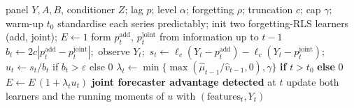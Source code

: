 \documentclass[pdflatex,sn-mathphys-ay]{sn-jnl}%
\theoremstyle{thmstyleone}%
\theoremstyle{thmstyletwo}%
\theoremstyle{thmstylethree}%
\begin{document}
\begin{algorithm}[h]
\caption{ANTE-SG (predictive group synergy, streaming)}\label{algo:antesg}
\begin{algorithmic}[1]
\Require panel $Y,A,B$, conditioner $Z$; lag $p$; level $\alpha$; forgetting $\rho$; truncation $c$; cap $\gamma$; warm-up $t_0$
\State standardise each series predictably; init two forgetting-RLS learners (add, joint); $E\gets1$
  \State form $p^{\mathrm{add}}_t,\,p^{\mathrm{joint}}_t$ from information up to $t-1$ 
  \State $b_t\gets2c|p^{\mathrm{add}}_t-p^{\mathrm{joint}}_t|$;\ observe $Y_t$;\ $s_t\gets\ell_c(Y_t-p^{\mathrm{add}}_t)-\ell_c(Y_t-p^{\mathrm{joint}}_t)$;\ $u_t\gets s_t/b_t$ if $b_t>\varepsilon$ else $0$
  \State $\lambda_t\gets\min\{\max(\hat\mu_{t-1}/\hat v_{t-1},0),\gamma\}$ \textbf{if} $t>t_0$ \textbf{else} $0$
  \State $E\gets E\,(1+\lambda_t u_t)$
   \Return \textbf{joint forecaster advantage detected} at $t$ \EndIf
  \State update both learners and the running moments of $u$ with $(\text{features}_t,Y_t)$
\EndFor
\end{algorithmic}
\end{algorithm}
\end{document}
